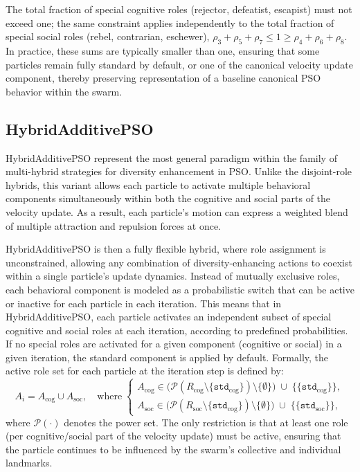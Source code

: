 {The total fraction of special cognitive roles (rejector, defeatist, escapist) must not exceed one; the same constraint applies independently to the total fraction of special social roles (rebel, contrarian, eschewer), \(\rho_3 + \rho_5 +  \rho_7 \leq 1 \geq \rho_4 + \rho_6 + \rho_8\). In practice, these sums are typically smaller than one, ensuring that some particles remain fully standard by default, or one of the canonical velocity update component, thereby preserving representation of a baseline canonical PSO behavior within the swarm.


\subsection{HybridAdditivePSO}


HybridAdditivePSO represent the most general paradigm within the family of multi-hybrid strategies for diversity enhancement in PSO. Unlike the disjoint-role hybrids, this variant allows each particle to activate multiple behavioral components simultaneously within both the cognitive and social parts of the velocity update. As a result, each particle’s motion can express a weighted blend of multiple attraction and repulsion forces at once.



HybridAdditivePSO is then a fully flexible hybrid, where role assignment is unconstrained, allowing any combination of diversity-enhancing actions to coexist within a single particle’s update dynamics. Instead of mutually exclusive roles, each behavioral component is modeled as a probabilistic switch that can be active or inactive for each particle in each iteration. This means that in HybridAdditivePSO, each particle activates an independent subset of special cognitive and social roles at each iteration, according to predefined probabilities. If no special roles are activated for a given component (cognitive or social) in a given iteration, the standard component is applied by default. Formally, the active role set for each particle at the iteration step is defined by:
\begin{equation}\label{eq:additive_roles}
A_i = A_{\text{cog}} \cup A_{\text{soc}}, 
\quad 
\text{where}
\;
\begin{cases}
A_{\text{cog}} \in \big( \mathcal{P}(R_{\text{cog}}\setminus \{\texttt{std}_{\text{cog}}\} ) \setminus \{\emptyset\} \big) \; \cup \; \{\{\texttt{std}_{\text{cog}}\}\},\\[6pt]
A_{\text{soc}} \in \big( \mathcal{P}(R_{\text{soc}}\setminus \{\texttt{std}_{\text{cog}}\} ) \setminus \{\emptyset\} \big) \; \cup \; \{\{\texttt{std}_{\text{soc}}\}\},
\end{cases}
\end{equation}
where $\mathcal{P}(\cdot)$ denotes the power set. The only restriction is that at least one role (per cognitive/social part of the velocity update) must be active, ensuring that the particle continues to be influenced by the swarm’s collective and individual landmarks.

}
